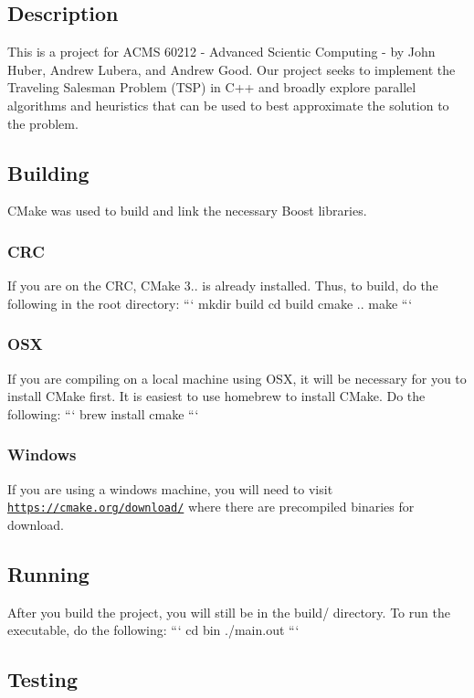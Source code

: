 \subsection*{Description}

This is a project for A\-C\-M\-S 60212 -\/ Advanced Scientic Computing -\/ by John Huber, Andrew Lubera, and Andrew Good. Our project seeks to implement the Traveling Salesman Problem (T\-S\-P) in C++ and broadly explore parallel algorithms and heuristics that can be used to best approximate the solution to the problem.

\subsection*{Building}

C\-Make was used to build and link the necessary Boost libraries.

\subsubsection*{C\-R\-C}

If you are on the C\-R\-C, C\-Make 3.. is already installed. Thus, to build, do the following in the root directory\-: ``` mkdir build cd build cmake .. make ``` \subsubsection*{O\-S\-X}

If you are compiling on a local machine using O\-S\-X, it will be necessary for you to install C\-Make first. It is easiest to use homebrew to install C\-Make. Do the following\-: ``` brew install cmake ``` \subsubsection*{Windows}

If you are using a windows machine, you will need to visit \href{https://cmake.org/download/}{\tt https\-://cmake.\-org/download/} where there are precompiled binaries for download.

\subsection*{Running}

After you build the project, you will still be in the build/ directory. To run the executable, do the following\-: ``` cd bin ./main.out ``` \subsection*{Testing}

